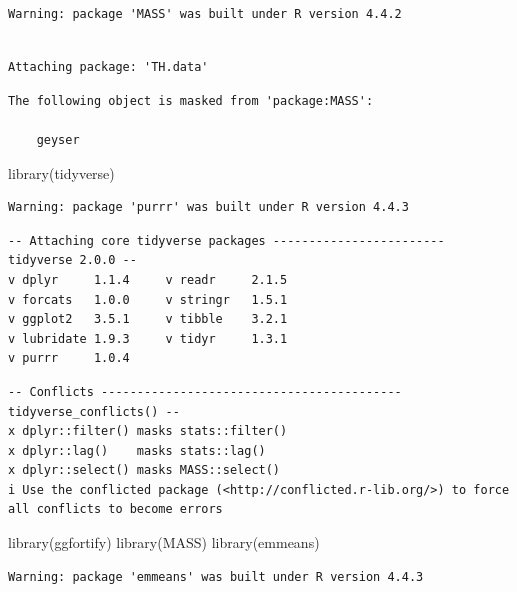 \documentclass[
  letterpaper,
  DIV=11,
  numbers=noendperiod]{scrartcl}
\newenvironment{Shaded}{\begin{snugshade}}{\end{snugshade}}
\newcommand{\FunctionTok}[1]{\textcolor[rgb]{0.28,0.35,0.67}{#1}}
\newcommand{\NormalTok}[1]{\textcolor[rgb]{0.00,0.23,0.31}{#1}}
\begin{document}
\begin{verbatim}
Warning: package 'MASS' was built under R version 4.4.2
\end{verbatim}

\begin{verbatim}

Attaching package: 'TH.data'
\end{verbatim}

\begin{verbatim}
The following object is masked from 'package:MASS':

    geyser
\end{verbatim}

\begin{Shaded}
\begin{Highlighting}[]
\FunctionTok{library}\NormalTok{(tidyverse)}
\end{Highlighting}
\end{Shaded}

\begin{verbatim}
Warning: package 'purrr' was built under R version 4.4.3
\end{verbatim}

\begin{verbatim}
-- Attaching core tidyverse packages ------------------------ tidyverse 2.0.0 --
v dplyr     1.1.4     v readr     2.1.5
v forcats   1.0.0     v stringr   1.5.1
v ggplot2   3.5.1     v tibble    3.2.1
v lubridate 1.9.3     v tidyr     1.3.1
v purrr     1.0.4     
\end{verbatim}

\begin{verbatim}
-- Conflicts ------------------------------------------ tidyverse_conflicts() --
x dplyr::filter() masks stats::filter()
x dplyr::lag()    masks stats::lag()
x dplyr::select() masks MASS::select()
i Use the conflicted package (<http://conflicted.r-lib.org/>) to force all conflicts to become errors
\end{verbatim}

\begin{Shaded}
\begin{Highlighting}[]
\FunctionTok{library}\NormalTok{(ggfortify)}
\FunctionTok{library}\NormalTok{(MASS)}
\FunctionTok{library}\NormalTok{(emmeans)}
\end{Highlighting}
\end{Shaded}

\begin{verbatim}
Warning: package 'emmeans' was built under R version 4.4.3
\end{verbatim}
\end{document}
